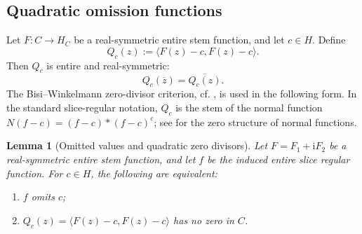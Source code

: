 \documentclass[11pt]{amsart}
\def\HH{H}%
\def\HHc{H_C}%
\def\CC{C}%
\numberwithin{equation}{section}
\newtheorem{lemma}[theorem]{Lemma}
\theoremstyle{definition}
\theoremstyle{remark}
\newcommand{\HH}{\mathbb H}
\newcommand{\CC}{\mathbb C}
\newcommand{\HHc}{\mathbb H_{\mathbb C}}
\begin{document}
\subsection{Quadratic omission functions}

Let $F:\CC\to\HHc$ be a real-symmetric entire stem function, and let $c\in\HH$.  Define
\[
Q_c(z):=\langle F(z)-c,F(z)-c\rangle.
\]
Then $Q_c$ is entire and real-symmetric:
\[
Q_c(\overline z)=\overline{Q_c(z)}.
\]
The Bisi--Winkelmann zero-divisor criterion, cf. \cite[Proposition~2.2]{BisiWinkelmann2020QuaternionicPicard}, is used in the following form.  In the standard slice-regular notation, $Q_c$ is the stem of the normal function $N(f-c)=(f-c)*(f-c)^c$; see \cite{GentiliStoppato2008Zeros,GentiliStoppatoStruppa2013Regular} for the zero structure of normal functions.

\begin{lemma}[Omitted values and quadratic zero divisors]\label{lem:zero-divisor}
Let $F=F_1+\mathrm iF_2$ be a real-symmetric entire stem function, and let $f$ be the induced entire slice regular function. For $c\in\HH$, the following are equivalent:
\begin{enumerate}[label=\textup{(\roman*)}]
\item $f$ omits $c$;
\item $Q_c(z)=\langle F(z)-c,F(z)-c\rangle$ has no zero in $\CC$.
\end{enumerate}
\end{lemma}
\end{document}
